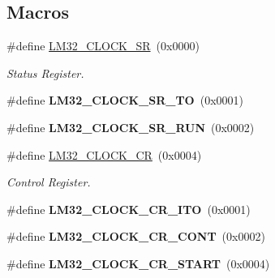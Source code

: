 \subsection*{Macros}
\begin{DoxyCompactItemize}
\item 
\mbox{\label{group__lm32__clock_ga66b8e77deeeace246897c2c8eedd0951}} 
\#define \mbox{\hyperlink{group__lm32__clock_ga66b8e77deeeace246897c2c8eedd0951}{L\+M32\+\_\+\+C\+L\+O\+C\+K\+\_\+\+SR}}~(0x0000)
\begin{DoxyCompactList}\small\item\em Status Register. \end{DoxyCompactList}\item 
\mbox{\label{group__lm32__clock_ga0c6a0169a312ab69782d9b0094eeec64}} 
\#define {\bfseries L\+M32\+\_\+\+C\+L\+O\+C\+K\+\_\+\+S\+R\+\_\+\+TO}~(0x0001)
\item 
\mbox{\label{group__lm32__clock_gabe793125ee516b75d8634abf19a13089}} 
\#define {\bfseries L\+M32\+\_\+\+C\+L\+O\+C\+K\+\_\+\+S\+R\+\_\+\+R\+UN}~(0x0002)
\item 
\mbox{\label{group__lm32__clock_ga3238a15517daa213e6be54c0f2718970}} 
\#define \mbox{\hyperlink{group__lm32__clock_ga3238a15517daa213e6be54c0f2718970}{L\+M32\+\_\+\+C\+L\+O\+C\+K\+\_\+\+CR}}~(0x0004)
\begin{DoxyCompactList}\small\item\em Control Register. \end{DoxyCompactList}\item 
\mbox{\label{group__lm32__clock_gaee2e758f02ccc4d065c1948133943462}} 
\#define {\bfseries L\+M32\+\_\+\+C\+L\+O\+C\+K\+\_\+\+C\+R\+\_\+\+I\+TO}~(0x0001)
\item 
\mbox{\label{group__lm32__clock_ga32afd220b31d5b2e6ce203b7da3a6b4f}} 
\#define {\bfseries L\+M32\+\_\+\+C\+L\+O\+C\+K\+\_\+\+C\+R\+\_\+\+C\+O\+NT}~(0x0002)
\item 
\mbox{\label{group__lm32__clock_gaeca4e0465b3c3b29ba16a4d8f95d86dd}} 
\#define {\bfseries L\+M32\+\_\+\+C\+L\+O\+C\+K\+\_\+\+C\+R\+\_\+\+S\+T\+A\+RT}~(0x0004)

\end{DoxyCompactItemize}
